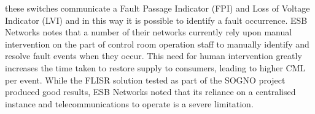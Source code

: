 these switches communicate a Fault Passage Indicator (FPI) and Loss of Voltage Indicator (LVI) and in this way it is possible to identify a fault occurrence. ESB Networks notes that a number of their networks currently rely upon
manual intervention on the part of control room operation staff to manually identify and resolve fault events when they occur. This need for human intervention greatly increases the time taken to restore supply to consumers, leading
to higher CML per event. While the FLISR solution tested as part of the SOGNO project produced good results, ESB Networks noted that its reliance on a centralised instance and telecommunications to operate is a severe limitation.

